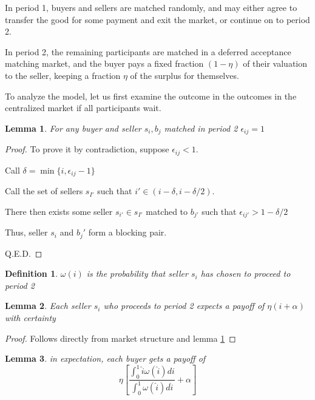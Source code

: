 \documentclass[WP]{AEA}
\newtheorem{lemma}{Lemma}
\newtheorem{deff}{Definition}
\begin{document}
In period 1, buyers and sellers are matched randomly, and may either agree to transfer the good for some payment and exit the market, or continue on to period 2.

In period 2, the remaining participants are matched in a deferred acceptance matching market, and the buyer pays a fixed fraction $(1-\eta)$ of their valuation to the seller, keeping a fraction $\eta$ of the surplus for themselves.

To analyze the model, let us first examine the outcome in the outcomes in the centralized market if all participants wait. 


\begin{lemma} \label{lemma:e_1}
For any buyer and seller ${s_i, b_j}$ matched in period 2  $\epsilon_{ij} = 1$
\end{lemma}
\begin{proof}
	To prove it by contradiction, suppose $\epsilon_{ij} < 1$.
	
	Call $\delta = \min{\{i, \epsilon_{ij}- 1\}}$
	
	Call the set of sellers $s_{I'}$ such that $i' \in (i-\delta, i-\delta / 2)$.
	
	There then exists some seller $s_{i'} \in s_{I'}$ matched to $b_{j'}$ such that $\epsilon_{ij'} > 1-\delta / 2$ 
	
	Thus, seller $s_i$ and $b_j'$ form a blocking pair.
	
	Q.E.D.
\end{proof}

\begin{deff}
	$\omega(i) $ is the probability that seller $s_i$ has chosen to proceed to period 2

\end{deff}

\begin{lemma}
	Each seller $s_i$ who proceeds to period 2 expects a payoff of $\eta (i+\alpha)$ with certainty

\end{lemma}

\begin{proof}
	Follows directly from market structure and lemma \ref{lemma:e_1}
\end{proof}

\begin{lemma}
	in expectation, each buyer gets a payoff of 
	\begin{equation} \label{eq:E_buyer}
		\eta  \left[ \frac{\int_0^1 \hat{i} \omega(\hat{i}) di}{\int_0^1  \omega(\hat{i}) d\hat{i} } + \alpha \right]
	\end{equation}
\end{lemma}
\end{document}
